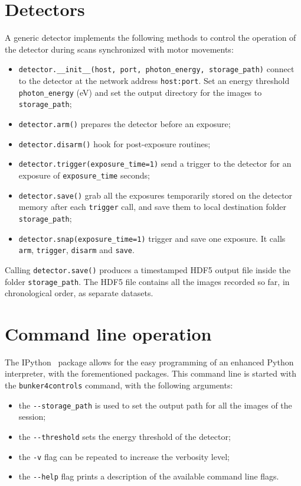 \section{Detectors}
A generic detector implements the following methods to control the operation
of the detector during scans synchronized with motor movements:
\begin{itemize}
    \item \verb|detector.__init__(host, port, photon_energy, storage_path)|
        connect to the detector at the network address \texttt{host:port}.
        Set an energy threshold \texttt{photon\_energy} (\si{\eV}) and set the
        output directory for the images to \texttt{storage\_path};
    \item \verb|detector.arm()| prepares the detector before an exposure;
    \item \verb|detector.disarm()| hook for post-exposure routines;
    \item \verb|detector.trigger(exposure_time=1)| send a trigger to the
        detector for an exposure of \texttt{exposure\_time} seconds;
    \item \verb|detector.save()| grab all the exposures temporarily stored
        on the detector memory after each \texttt{trigger} call, and save
        them to local destination folder \texttt{storage\_path};
    \item \verb|detector.snap(exposure_time=1)| trigger and save one
        exposure. It calls \texttt{arm}, \texttt{trigger}, \texttt{disarm} and
        \texttt{save}.
\end{itemize}

Calling \texttt{detector.save()} produces a timestamped HDF5 output file inside the
folder \texttt{storage\_path}. The HDF5 file contains all the images
recorded so far, in chronological order, as separate datasets.

\section{Command line operation}
The IPython~\parencite{PER-GRA:2007} package allows for the easy programming of
an enhanced Python interpreter, with the forementioned packages. This
command line is started with the \texttt{bunker4controls} command, with
the following arguments:

\begin{itemize}
    \item the \verb|--storage_path| is used to set the output path for all the images
of the session;
    \item the \verb|--threshold| sets the energy threshold of the detector;
    \item the \verb|-v| flag can be repeated to increase the verbosity
        level;
    \item the \verb|--help| flag prints a description of the available command line
        flags.
\end{itemize}

